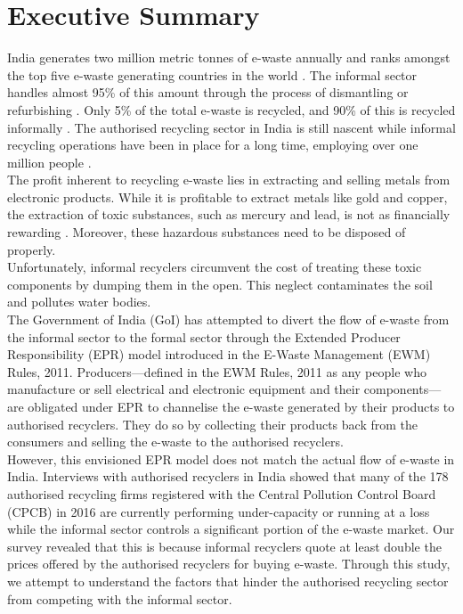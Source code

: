 \documentclass[a4paper, 12pt]{article}
\begin{document}
                    \section*{Executive Summary}
                    India generates two million metric tonnes of e-waste annually and ranks amongst the top five e-waste generating countries in the world \parencite{shenoynews}. The informal sector handles almost 95\% of this amount through the process of dismantling or refurbishing \parencite{assochamstats}. Only 5\% of the total e-waste is recycled, and 90\% of this is recycled informally \parencite{assochamstats, kumarnews}. The authorised recycling sector in India is still nascent while informal recycling operations have been in place for a long time, employing over one million people \parencite{baldereport}. \\
                    
                    The profit inherent to recycling e-waste lies in extracting and selling metals from electronic products. While it is profitable to extract metals like gold and copper, the extraction of toxic substances, such as mercury and lead, is not as financially rewarding \parencite{worstallnews}. Moreover, these hazardous substances need to be disposed of properly. \\
                    
                    Unfortunately, informal recyclers circumvent the cost of treating these toxic components by dumping them in the open. This neglect contaminates the soil and pollutes water bodies. \\
                    
                    The Government of India (GoI) has attempted to divert the flow of e-waste from the informal sector to the formal sector through the Extended Producer Responsibility (EPR) model introduced in the E-Waste Management (EWM) Rules, 2011. Producers—defined in the EWM Rules, 2011 as any people who manufacture or sell electrical and electronic equipment and their components—are obligated under EPR to channelise the e-waste generated by their products to authorised recyclers. They do so by collecting their products back from the consumers and selling the e-waste to the authorised recyclers. \\
                    
                    However, this envisioned EPR model does not match the actual flow of e-waste in India. Interviews with authorised recyclers in India showed that many of the 178 authorised recycling firms registered with the Central Pollution Control Board (CPCB) in 2016 are currently performing under-capacity or running at a loss while the informal sector controls a significant portion of the e-waste market. Our survey revealed that this is because informal recyclers quote at least double the prices offered by the authorised recyclers for buying e-waste. Through this study, we attempt to understand the factors that hinder the authorised recycling sector from competing with the informal sector. \\
\end{document}
